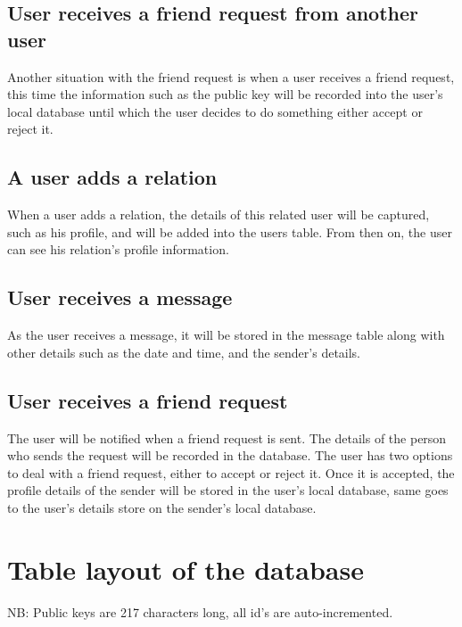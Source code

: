 \subsection{User receives a friend request from another user}
Another situation with the friend request is when a user receives a friend request, this time the information such as the public key will be recorded into the user's local database until which the user decides to do something either accept or reject it.

\subsection{A user adds a relation}
When a user adds a relation, the details of this related user will be captured, such as his profile, and will be added into the users table. From then on, the user can see his relation's profile information. 

\subsection{User receives a message} 
As the user receives a message, it will be stored in the message table along with other details such as the date and time, and the sender's details.

\subsection{User receives a friend request}
The user will be notified when a friend request is sent. The details of the person who sends the request will be recorded in the database. The user has two options to deal with a friend request, either to accept or reject it. Once it is accepted, the profile details of the sender will be stored in the user's local database, same goes to the user's details store on the sender's local database.

\clearpage

\section{Table layout of the database}
NB: Public keys are 217 characters long, all id's are auto-incremented.

